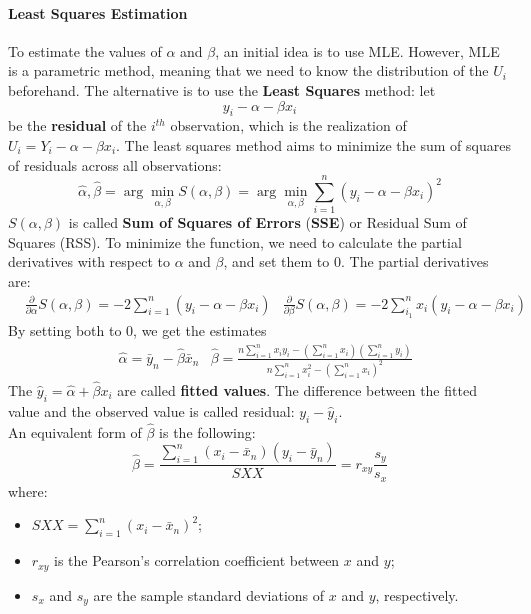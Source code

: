 \paragraph{Least Squares Estimation}
To estimate the values of $\alpha$ and $\beta$, an initial idea is to use MLE. However, MLE is a parametric method, meaning that we need to know the distribution of the $U_i$ beforehand. The alternative is to use the \textbf{Least Squares} method: let
\begin{equation*}
    y_i - \alpha - \beta x_i
\end{equation*}   
be the \textbf{residual} of the $i^{th}$ observation, which is the realization of $U_i = Y_i - \alpha - \beta x_i$. The least squares method aims to minimize the sum of squares of residuals across all observations:
\begin{equation*}
    \hat{\alpha}, \hat{\beta} = \arg \min_{\alpha, \beta} S(\alpha, \beta) = \arg \min_{\alpha, \beta} \sum_{i=1}^n (y_i - \alpha - \beta x_i)^2
\end{equation*}   
$S(\alpha, \beta)$ is called \textbf{Sum of Squares of Errors} (\textbf{SSE}) or Residual Sum of Squares (RSS). To minimize the function, we need to calculate the partial derivatives with respect to $\alpha$ and $\beta$, and set them to 0. The partial derivatives are:
\begin{align*}
    &\frac{\partial}{\partial \alpha} S(\alpha, \beta) = - 2 \sum_{i=1}^n (y_i - \alpha - \beta x_i) &\frac{\partial}{\partial \beta} S(\alpha, \beta) = - 2 \sum_{i_1}^n x_i (y_i - \alpha - \beta x_i)
\end{align*}
By setting both to 0, we get the estimates
\begin{align*}
    &\hat{\alpha} = \bar{y}_n - \hat{\beta} \bar{x}_n &\hat{\beta} = \frac{n \sum_{i=1}^n x_i y_i - (\sum_{i=1}^n x_i)(\sum_{i=1}^n y_i)}{n \sum_{i=1}^n x_i^2 - (\sum_{i=1}^n x_i)^2}
\end{align*}
The $\hat{y}_i = \hat{\alpha} + \hat{\beta} x_i$ are called \textbf{fitted values}. The difference between the fitted value and the observed value is called residual: $y_i - \hat{y}_i$. \\
An equivalent form of $\hat{\beta}$ is the following:
\begin{equation*}
    \hat{\beta} = \frac{\sum_{i=1}^n (x_i - \bar{x}_n)(y_i - \bar{y}_n)}{SXX} = r_{xy} \frac{s_y}{s_x}
\end{equation*}   
where:
\begin{itemize}[itemsep=0pt]
    \item $SXX = \sum_{i=1}^n (x_i - \bar{x}_n)^2$;
    \item $r_{xy}$ is the Pearson's correlation coefficient between $x$ and $y$;
    \item $s_x$ and $s_y$ are the sample standard deviations of $x$ and $y$, respectively.
\end{itemize}
